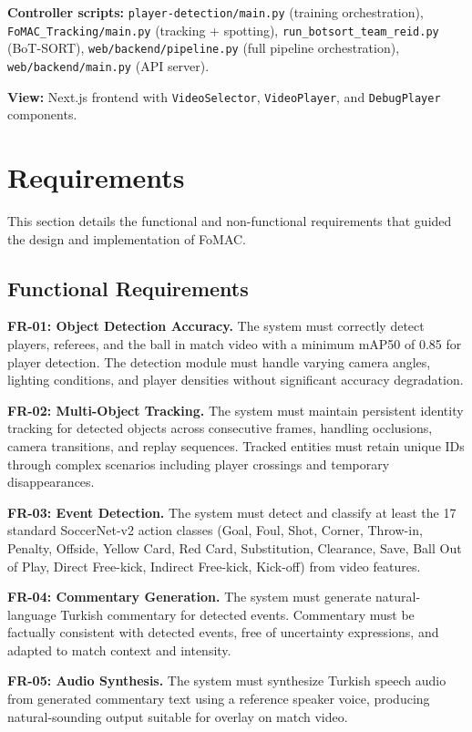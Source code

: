 \documentclass[10pt,twocolumn,a4paper]{article}
\begin{document}
\textbf{Controller scripts:} \texttt{player-detection/main.py} (training orchestration), \texttt{FoMAC\_Tracking/main.py} (tracking + spotting), \texttt{run\_botsort\_team\_reid.py} (BoT-SORT), \texttt{web/backend/pipeline.py} (full pipeline orchestration), \texttt{web/backend/main.py} (API server).

\textbf{View:} Next.js frontend with \texttt{VideoSelector}, \texttt{VideoPlayer}, and \texttt{DebugPlayer} components.

\section{Requirements}

This section details the functional and non-functional requirements that guided the design and implementation of FoMAC.

\subsection{Functional Requirements}

\textbf{FR-01: Object Detection Accuracy.} The system must correctly detect players, referees, and the ball in match video with a minimum mAP50 of 0.85 for player detection. The detection module must handle varying camera angles, lighting conditions, and player densities without significant accuracy degradation.

\textbf{FR-02: Multi-Object Tracking.} The system must maintain persistent identity tracking for detected objects across consecutive frames, handling occlusions, camera transitions, and replay sequences. Tracked entities must retain unique IDs through complex scenarios including player crossings and temporary disappearances.

\textbf{FR-03: Event Detection.} The system must detect and classify at least the 17 standard SoccerNet-v2 action classes (Goal, Foul, Shot, Corner, Throw-in, Penalty, Offside, Yellow Card, Red Card, Substitution, Clearance, Save, Ball Out of Play, Direct Free-kick, Indirect Free-kick, Kick-off) from video features.

\textbf{FR-04: Commentary Generation.} The system must generate natural-language Turkish commentary for detected events. Commentary must be factually consistent with detected events, free of uncertainty expressions, and adapted to match context and intensity.

\textbf{FR-05: Audio Synthesis.} The system must synthesize Turkish speech audio from generated commentary text using a reference speaker voice, producing natural-sounding output suitable for overlay on match video.
\end{document}
